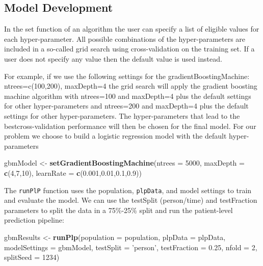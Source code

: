 \documentclass[11pt]{book}
\newenvironment{Shaded}{\begin{snugshade}}{\end{snugshade}}
\newcommand{\KeywordTok}[1]{\textcolor[rgb]{0.13,0.29,0.53}{\textbf{#1}}}
\newcommand{\DataTypeTok}[1]{\textcolor[rgb]{0.13,0.29,0.53}{#1}}
\newcommand{\DecValTok}[1]{\textcolor[rgb]{0.00,0.00,0.81}{#1}}
\newcommand{\FloatTok}[1]{\textcolor[rgb]{0.00,0.00,0.81}{#1}}
\newcommand{\StringTok}[1]{\textcolor[rgb]{0.31,0.60,0.02}{#1}}
\newcommand{\NormalTok}[1]{#1}
\begin{document}
\subsection{Model Development}\label{model-development}

In the set function of an algorithm the user can specify a list of
eligible values for each hyper-parameter. All possible combinations of
the hyper-parameters are included in a so-called grid search using
cross-validation on the training set. If a user does not specify any
value then the default value is used instead.

For example, if we use the following settings for the
gradientBoostingMachine: ntrees=c(100,200), maxDepth=4 the grid search
will apply the gradient boosting machine algorithm with ntrees=100 and
maxDepth=4 plus the default settings for other hyper-parameters and
ntrees=200 and maxDepth=4 plus the default settings for other
hyper-parameters. The hyper-parameters that lead to the
bestcross-validation performance will then be chosen for the final
model. For our problem we choose to build a logistic regression model
with the default hyper-parameters

\begin{Shaded}
\begin{Highlighting}[]
\NormalTok{gbmModel <-}\StringTok{ }\KeywordTok{setGradientBoostingMachine}\NormalTok{(}\DataTypeTok{ntrees =} \DecValTok{5000}\NormalTok{, }
                                       \DataTypeTok{maxDepth =} \KeywordTok{c}\NormalTok{(}\DecValTok{4}\NormalTok{,}\DecValTok{7}\NormalTok{,}\DecValTok{10}\NormalTok{), }
                                       \DataTypeTok{learnRate =} \KeywordTok{c}\NormalTok{(}\FloatTok{0.001}\NormalTok{,}\FloatTok{0.01}\NormalTok{,}\FloatTok{0.1}\NormalTok{,}\FloatTok{0.9}\NormalTok{))}
\end{Highlighting}
\end{Shaded}

The \texttt{runPlP} function uses the population, \texttt{plpData}, and
model settings to train and evaluate the model. We can use the testSplit
(person/time) and testFraction parameters to split the data in a
75\%-25\% split and run the patient-level prediction pipeline:

\begin{Shaded}
\begin{Highlighting}[]
\NormalTok{gbmResults <-}\StringTok{ }\KeywordTok{runPlp}\NormalTok{(}\DataTypeTok{population =}\NormalTok{ population, }
                     \DataTypeTok{plpData =}\NormalTok{ plpData, }
                     \DataTypeTok{modelSettings =}\NormalTok{ gbmModel, }
                     \DataTypeTok{testSplit =} \StringTok{'person'}\NormalTok{,}
                     \DataTypeTok{testFraction =} \FloatTok{0.25}\NormalTok{, }
                     \DataTypeTok{nfold =} \DecValTok{2}\NormalTok{, }
                     \DataTypeTok{splitSeed =} \DecValTok{1234}\NormalTok{)}
\end{Highlighting}
\end{Shaded}
\end{document}
